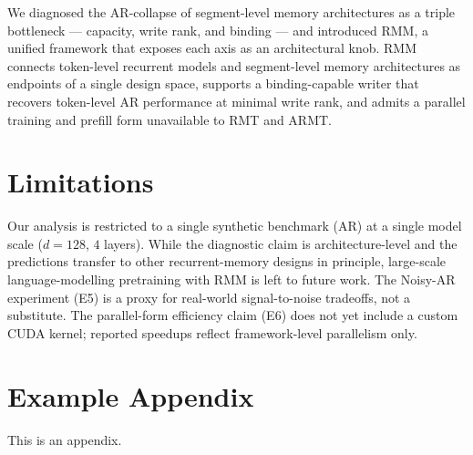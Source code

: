 \documentclass[11pt]{article}
\begin{document}
We diagnosed the AR-collapse of segment-level memory architectures as a triple bottleneck — capacity, write rank, and binding — and introduced RMM, a unified framework that exposes each axis as an architectural knob. RMM connects token-level recurrent models and segment-level memory architectures as endpoints of a single design space, supports a binding-capable writer that recovers token-level AR performance at minimal write rank, and admits a parallel training and prefill form unavailable to RMT and ARMT.

\section*{Limitations}
Our analysis is restricted to a single synthetic benchmark (AR) at a single model scale ($d{=}128$, $4$ layers). While the diagnostic claim is architecture-level and the predictions transfer to other recurrent-memory designs in principle, large-scale language-modelling pretraining with RMM is left to future work. The Noisy-AR experiment (E5) is a proxy for real-world signal-to-noise tradeoffs, not a substitute. The parallel-form efficiency claim (E6) does not yet include a custom CUDA kernel; reported speedups reflect framework-level parallelism only.



%


\appendix

\section{Example Appendix}
\label{sec:appendix}

This is an appendix.
\end{document}

